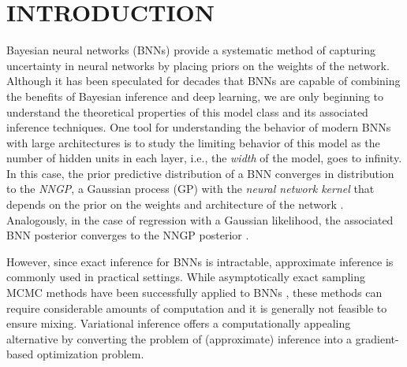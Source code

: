 \documentclass[twoside]{article}
\theoremstyle{theoremstyle}
\begin{document}
\section{INTRODUCTION}\label{sec:introduction}
Bayesian neural networks (BNNs) provide a systematic method of capturing uncertainty in neural networks by placing priors on the weights of the network. Although it has been speculated for decades that BNNs are capable of combining the benefits of Bayesian inference and deep learning, we are only beginning to understand the theoretical properties of this model class and its associated inference techniques. 
One tool for understanding the behavior of modern BNNs with large architectures is to study the limiting behavior of this model as the number of hidden units in each layer, i.e., the \emph{width} of the model, goes to infinity. In this case, the prior predictive distribution of a BNN converges in distribution to the \textit{NNGP}, a Gaussian process (GP) with the \emph{neural network kernel} that depends on the prior on the weights and architecture of the network \citep{neal_1996, matthews_2018}. Analogously, in the case of regression with a Gaussian likelihood, the associated BNN posterior converges to the NNGP posterior \citep{hron_2020}.

However, since exact inference for BNNs is intractable, approximate inference is commonly used in practical settings. While asymptotically exact sampling MCMC methods have been successfully applied to BNNs \citep{neal_1996,izmailov2021bayesian}, these methods can require considerable amounts of computation and it is generally not feasible to ensure mixing.  Variational inference offers a computationally appealing alternative by converting the problem of (approximate) inference into a gradient-based optimization problem. 
\end{document}
